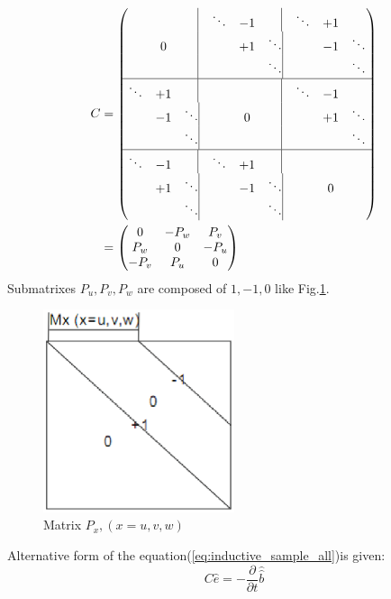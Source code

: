 \begin{align}
C&=
	\begin{pmatrix}
	&&\quad\vline &\ddots &-1&\quad\vline  &\ddots &+1&\\	
	&0&\quad\vline	& &+1 &\ddots\vline	 &&-1&\ddots\\
	&&\quad\vline	&&&\ddots\vline			 &&&\ddots\\	
	\hline
	\ddots &+1&\quad\vline	&&&\quad\vline	 &\ddots &-1&\\
	&-1 &\ddots\vline	&&0&\quad\vline	&&+1&\ddots\\
	&&\ddots\vline	&&&\quad\vline	&&&\ddots\\
	\hline
	\ddots &-1&\quad\vline &\ddots &+1&\quad\vline	&&&\\
	&+1 &\ddots\vline	&&-1&\ddots\vline	&&0&\\
	&&\ddots\vline		&&&\ddots\vline	&&&
	\end{pmatrix}\nonumber\\
	&=
	\begin{pmatrix}
	0&-P_{w}&P_{v}\\
	P_{w}&0&-P_{u}\\
	-P_{v}&P_{u}&0
	\end{pmatrix}
\label{eq:C_matrix}
\end{align}
Submatrixes $P_{u},P_{v},P_{w}$ are composed of $1,-1,0$ like Fig.\ref{fig:Matrix Px}.\\ 
\begin{figure}[!ht]
\centering
\includegraphics[width=0.5\textwidth]{bilder/P_matrix}
\caption{Matrix $P_{x},(x=u,v,w)$}
\label{fig:Matrix Px}
\end{figure}
Alternative form of the equation(\ref{eq:inductive_sample_all})is given:
\begin{equation}
C\widehat{e}=-\frac{\partial}{\partial{t}}\widehat{\widehat{b}}
\label{eq:inductive_integral_all}
\end{equation}
